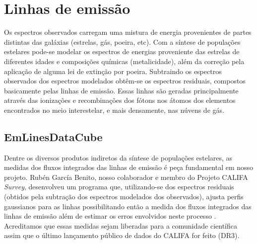 


\chapter{Linhas de emissão}
\label{sec:emlines}

Os espectros observados carregam uma mistura de energia provenientes de partes distintas das
galáxias (estrelas, gás, poeira, etc). Com a síntese de populações estelares pode-se modelar os
espectros de energias proveniente das estrelas de diferentes idades e composições químicas
(metalicidade), além da correção pela aplicação de alguma lei de extinção por poeira. Subtraindo os
espectros observados dos espectros modelados obtêm-se os espectros residuais, compostos basicamente
pelas linhas de emissão. Essas linhas são geradas principalmente através das ionizações e
recombinações dos fótons nos átomos dos elementos encontrados no meio interestelar, e mais
densamente, nas núvens de gás.

\section{EmLinesDataCube}
\label{sec:emline:datacube}

Dentre os diversos produtos indiretos da síntese de populações estelares, as medidas dos fluxos
integrados das linhas de emissão é peça fundamental em nosso projeto. Rubén García Benito, nosso
colaborador e membro do Projeto CALIFA {\em Survey}, desenvolveu um programa que, utilizando-se dos
espectros residuais (obtidos pela subtração dos espectros modelados dos observados), ajusta perfis
gaussianos para as linhas possibilitando então a medida dos fluxos integrados das linhas de emissão
além de estimar os erros envolvidos neste processo . Acreditamos
que essas medidas sejam liberadas para a comunidade científica assim que o último lançamento público
de dados do CALIFA for feito (DR3).


